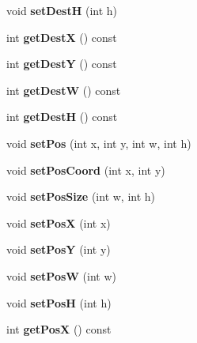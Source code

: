 \begin{DoxyCompactItemize}
void {\bfseries set\+DestH} (int h)
\item 
\mbox{\label{classObject_abdffad61634a7f63fe74e86163ff338f}} 
int {\bfseries get\+DestX} () const
\item 
\mbox{\label{classObject_abcdfb4d5d240e4f0e063b1a49e814f6e}} 
int {\bfseries get\+DestY} () const
\item 
\mbox{\label{classObject_a162d36c8f7b1cf921cd814276b1cd6c0}} 
int {\bfseries get\+DestW} () const
\item 
\mbox{\label{classObject_a7b5d432749f77eff613bbd66bd1585b1}} 
int {\bfseries get\+DestH} () const
\item 
\mbox{\label{classObject_a41afdccb37a804853d9d8704ed4a3b9b}} 
void {\bfseries set\+Pos} (int x, int y, int w, int h)
\item 
\mbox{\label{classObject_a494e9ca36ba11fa9f09de7f96711cee7}} 
void {\bfseries set\+Pos\+Coord} (int x, int y)
\item 
\mbox{\label{classObject_af35cb0478e83025206b9b87780ff9ba7}} 
void {\bfseries set\+Pos\+Size} (int w, int h)
\item 
\mbox{\label{classObject_ac419339f2d1173f39f355b7d8ccd1715}} 
void {\bfseries set\+PosX} (int x)
\item 
\mbox{\label{classObject_ac696206993d120e2e45fe1ce4bf16a53}} 
void {\bfseries set\+PosY} (int y)
\item 
\mbox{\label{classObject_a7adf0c2c59323a5b6de8f78262ea81d6}} 
void {\bfseries set\+PosW} (int w)
\item 
\mbox{\label{classObject_a86870ca9b06bd3153bb3f8e7b8835c46}} 
void {\bfseries set\+PosH} (int h)
\item 
\mbox{\label{classObject_ab3465d52417151df5f952112ea6649e0}} 
int {\bfseries get\+PosX} () const
\item 
\mbox{\label{classObject_a7c3aa5f6015a690962268712a2c742ab}} 

\end{DoxyCompactItemize}
